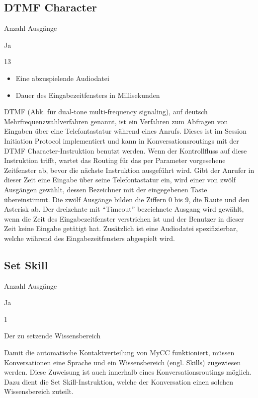 \subsection{DTMF Character}
\begin{labeling}{Anzahl Ausgänge}
\item [Eingang] Ja
\item [Anzahl Ausgänge] 13
\item [Parameter] \begin{itemize} \item Eine abzuspielende Audiodatei  \item Dauer des Eingabezeitfensters in Millisekunden \end{itemize}
\item [Beschreibung] DTMF (Abk. für dual-tone multi-frequency signaling), auf deutsch Mehrfrequenzwahlverfahren genannt, ist ein Verfahren zum Abfragen von Eingaben über eine Telefontastatur während eines Anrufs. Dieses ist im Session Initiation Protocol implementiert und kann in Konversationsroutings mit der DTMF Character-Instruktion benutzt werden. Wenn der Kontrollfluss auf diese Instruktion trifft, wartet das Routing für das per Parameter vorgesehene Zeitfenster ab, bevor die nächste Instruktion ausgeführt wird. Gibt der Anrufer in dieser Zeit eine Eingabe über seine Telefontastatur ein, wird einer von zwölf Ausgängen gewählt, dessen Bezeichner mit der eingegebenen Taste übereinstimmt. Die zwölf Ausgänge bilden die Ziffern 0 bis 9, die Raute und den Asterisk ab. Der dreizehnte mit ``Timeout'' bezeichnete Ausgang wird gewählt, wenn die Zeit des Eingabezeitfenster verstrichen ist und der Benutzer in dieser Zeit keine Eingabe getätigt hat. Zusätzlich ist eine Audiodatei spezifizierbar, welche während des Eingabezeitfensters abgespielt wird.  
\end{labeling}

\subsection{Set Skill}
\label{subsec:Set Skill}
\begin{labeling}{Anzahl Ausgänge}
\item [Eingang] Ja
\item [Anzahl Ausgänge] 1
\item [Parameter] Der zu setzende Wissensbereich
\item [Beschreibung] Damit die automatische Kontaktverteilung von MyCC funktioniert, müssen Konversationen eine Sprache und ein Wissensbereich (engl. Skills) zugewiesen werden. Diese Zuweisung ist auch innerhalb eines Konversationsroutings möglich. Dazu dient die Set Skill-Instruktion, welche der Konversation einen solchen Wissensbereich zuteilt.
\end{labeling}

